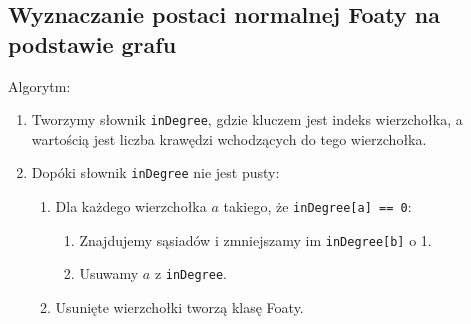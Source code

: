 \documentclass[11pt]{article}
\begin{document}
\subsection*{Wyznaczanie postaci normalnej Foaty na podstawie grafu}
\label{sec:org4efe275}
Algorytm:
\begin{enumerate}
\item Tworzymy słownik \texttt{inDegree}, gdzie kluczem jest indeks wierzchołka, a
wartością jest liczba krawędzi wchodzących do tego wierzchołka.
\item Dopóki słownik \texttt{inDegree} nie jest pusty:
\begin{enumerate}
\item Dla każdego wierzchołka \(a\) takiego, że \texttt{inDegree[a] == 0}:
\begin{enumerate}
\item Znajdujemy sąsiadów i zmniejszamy im \texttt{inDegree[b]}  o 1.
\item Usuwamy \(a\) z \texttt{inDegree}.
\end{enumerate}
\item Usunięte wierzchołki tworzą klasę Foaty.
\end{enumerate}
\end{enumerate}
\end{document}
